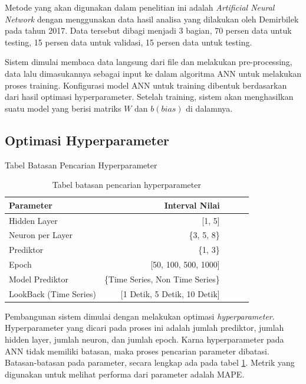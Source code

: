 Metode yang akan digunakan dalam penelitian ini adalah \emph{Artificial Neural Network} dengan menggunakan data hasil analisa yang dilakukan oleh Demirbilek pada tahun 2017\cite{DemirbilekReport}. Data tersebut dibagi menjadi 3 bagian, 70 persen data untuk testing, 15 persen data untuk validasi, 15 persen data untuk testing.

Sistem dimulai membaca data langsung dari file dan melakukan pre-processing, data lalu dimasukannya sebagai input ke dalam algoritma ANN untuk melakukan proses training. Konfigurasi model ANN untuk training dibentuk berdasarkan dari hasil optimasi hyperparameter. Setelah training, sistem akan menghasilkan suatu model yang berisi matriks $W$ dan $b (bias)$ di dalamnya.

\subsection{Optimasi Hyperparameter}
\begin{table}[h]
  \caption*{Tabel Batasan Pencarian Hyperparameter}
  \begin{center}
    \begin{tabular}{lrrrr}
      \toprule
      Parameter &        Interval Nilai \\
      \midrule
      Hidden Layer            & {[}1, 5{]}     \\
      Neuron per Layer        & \{3, 5, 8\}    \\
      Prediktor               & \{1, 3\}       \\
      Epoch                   & {[}50, 100, 500, 1000{]} \\
      Model Prediktor         & \{Time Series, Non Time Series\} \\
      LookBack (Time Series)  & {[}1 Detik, 5 Detik, 10 Detik{]}\\

      \bottomrule
    \end{tabular}
  \end{center}
  \caption{Tabel batasan pencarian hyperparameter}\label{tab:batasanParameter}
\end{table}

Pembangunan sistem dimulai dengan melakukan optimasi \emph{hyperparameter}. Hyperparameter yang dicari pada proses ini adalah jumlah prediktor, jumlah hidden layer, jumlah neuron, dan jumlah epoch. Karna hyperparameter pada ANN tidak memiliki batasan, maka proses pencarian parameter dibatasi. Batasan-batasan pada parameter, secara lengkap ada pada tabel \ref{tab:batasanParameter}. Metrik yang digunakan untuk melihat performa dari parameter adalah MAPE. 

